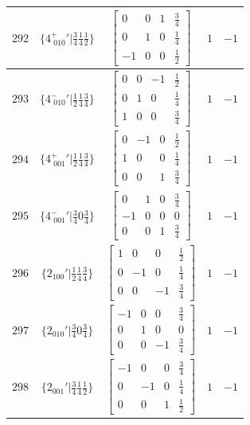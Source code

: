 \documentclass[fleqn,8pt]{jsarticle}
\begin{document}
\begin{longtable}{ccccc}
$ 292 $ & $ \{4^{+}_{\,\,010}{}'|\frac{3}{4} \frac{1}{4} \frac{1}{2}\} $ & $ \begin{bmatrix} 0 & 0 & 1 & \frac{3}{4} \\ 0 & 1 & 0 & \frac{1}{4} \\ -1 & 0 & 0 & \frac{1}{2} \end{bmatrix} $ & $ 1 $ & $ -1 $ \\ \hline
$ 293 $ & $ \{4^{-}_{\,\,010}{}'|\frac{1}{2} \frac{1}{4} \frac{3}{4}\} $ & $ \begin{bmatrix} 0 & 0 & -1 & \frac{1}{2} \\ 0 & 1 & 0 & \frac{1}{4} \\ 1 & 0 & 0 & \frac{3}{4} \end{bmatrix} $ & $ 1 $ & $ -1 $ \\ \hline
$ 294 $ & $ \{4^{+}_{\,\,001}{}'|\frac{1}{2} \frac{1}{4} \frac{3}{4}\} $ & $ \begin{bmatrix} 0 & -1 & 0 & \frac{1}{2} \\ 1 & 0 & 0 & \frac{1}{4} \\ 0 & 0 & 1 & \frac{3}{4} \end{bmatrix} $ & $ 1 $ & $ -1 $ \\ \hline
$ 295 $ & $ \{4^{-}_{\,\,001}{}'|\frac{3}{4} 0 \frac{3}{4}\} $ & $ \begin{bmatrix} 0 & 1 & 0 & \frac{3}{4} \\ -1 & 0 & 0 & 0 \\ 0 & 0 & 1 & \frac{3}{4} \end{bmatrix} $ & $ 1 $ & $ -1 $ \\ \hline
$ 296 $ & $ \{2{}_{100}{}'|\frac{1}{2} \frac{1}{4} \frac{3}{4}\} $ & $ \begin{bmatrix} 1 & 0 & 0 & \frac{1}{2} \\ 0 & -1 & 0 & \frac{1}{4} \\ 0 & 0 & -1 & \frac{3}{4} \end{bmatrix} $ & $ 1 $ & $ -1 $ \\ \hline
$ 297 $ & $ \{2{}_{010}{}'|\frac{3}{4} 0 \frac{3}{4}\} $ & $ \begin{bmatrix} -1 & 0 & 0 & \frac{3}{4} \\ 0 & 1 & 0 & 0 \\ 0 & 0 & -1 & \frac{3}{4} \end{bmatrix} $ & $ 1 $ & $ -1 $ \\ \hline
$ 298 $ & $ \{2{}_{001}{}'|\frac{3}{4} \frac{1}{4} \frac{1}{2}\} $ & $ \begin{bmatrix} -1 & 0 & 0 & \frac{3}{4} \\ 0 & -1 & 0 & \frac{1}{4} \\ 0 & 0 & 1 & \frac{1}{2} \end{bmatrix} $ & $ 1 $ & $ -1 $ \\ \hline

\end{longtable}
\end{document}
